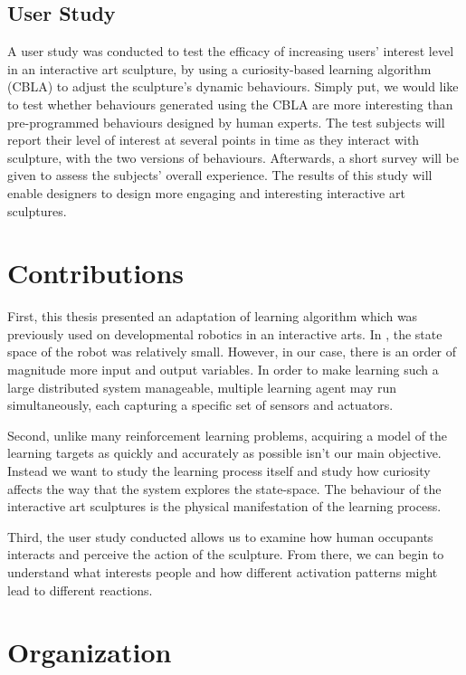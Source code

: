 \subsection{User Study}

A user study was conducted to test the efficacy of increasing users’ interest level in an interactive art sculpture, by using a curiosity-based learning algorithm (CBLA) to adjust the sculpture’s dynamic behaviours. Simply put, we would like to test whether behaviours generated using the CBLA are more interesting than pre-programmed behaviours designed by human experts. The test subjects will report their level of interest at several points in time as they interact with sculpture, with the two versions of behaviours. Afterwards, a short survey will be given to assess the subjects’ overall experience. The results of this study will enable designers to design more engaging and interesting interactive art sculptures.


\section{Contributions}

First, this thesis presented an adaptation of learning algorithm which was previously used on developmental robotics in an interactive arts. In \cite{Oudeyer2007}, the state space of the robot was relatively small. However, in our case, there is an order of magnitude more input and output variables. In order to make learning such a large distributed system manageable, multiple learning agent may run simultaneously, each capturing a specific set of sensors and actuators. 

Second, unlike many reinforcement learning problems, acquiring a model of the learning targets as quickly and accurately as possible isn't our main objective. Instead we want to study the learning process itself and study how curiosity affects the way that the system explores the state-space. The behaviour of the interactive art sculptures is the physical manifestation of the learning process. 

Third, the user study conducted allows us to examine how human occupants interacts and perceive the action of the sculpture. From there, we can begin to understand what interests people and how different activation patterns might lead to different reactions. 


\section{Organization}

